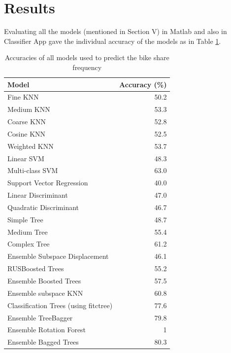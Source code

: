 \documentclass[journal, a4paper]{IEEEtran}
\begin{document}
\section{Results}
Evaluating all the models (mentioned in Section V) in Matlab and also in Classifier App gave the individual accuracy of the models as in Table \ref{resultsAllAccuracies}.
\begin{center}
\begin{table}[ht!]
\centering
 \begin{tabular}{||l r||} 
 \hline
 Model & Accuracy (\%) \\ [0.5ex] 
 \hline\hline
Fine KNN & 50.2 \\
\hline
Medium KNN & 53.3 \\
\hline
Coarse KNN & 52.8 \\
\hline
Cosine KNN & 52.5 \\
\hline
Weighted KNN & 53.7 \\
\hline
Linear SVM & 48.3 \\
\hline 
Multi-class SVM & 63.0 \\
\hline
Support Vector Regression & 40.0\\
\hline 
Linear Discriminant & 47.0\\
\hline 
Quadratic Discriminant & 46.7\\
\hline
Simple Tree & 48.7\\
\hline 
Medium Tree & 55.4\\
\hline 
Complex Tree & 61.2\\
\hline 
Ensemble Subspace Displacement & 46.1\\
\hline
RUSBoosted Trees & 55.2\\
\hline 
Ensemble Boosted Trees & 57.5\\
\hline 
Ensemble subspace KNN & 60.8\\
\hline
Classification Trees (using fitctree) & 77.6\\
\hline 
Ensemble TreeBagger & 79.8 \\
\hline 
Ensemble Rotation Forest & 1 \\
\hline 
Ensemble Bagged Trees & 80.3\\[1ex] 
 \hline
\end{tabular}
\caption{Accuracies of all models used to predict the bike share frequency}
 \label{resultsAllAccuracies}
\end{table}
\end{center}
\end{document}
